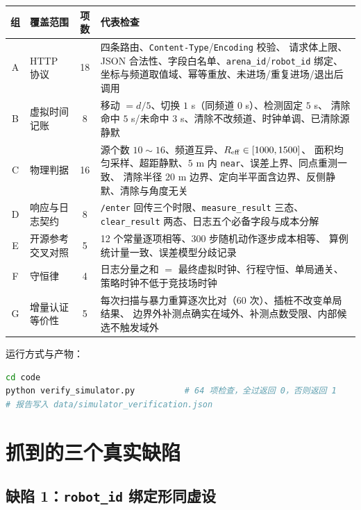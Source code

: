 \begin{center}
\begin{tabular}{clcp{6.6cm}}
\toprule
组 & 覆盖范围 & 项数 & 代表检查 \\ \midrule
A & HTTP 协议 & 18 & 四条路由、\texttt{Content-Type}/\texttt{Encoding} 校验、
请求体上限、JSON 合法性、字段白名单、\texttt{arena\_id}/\texttt{robot\_id} 绑定、
坐标与频道取值域、幂等重放、未进场/重复进场/退出后调用 \\
B & 虚拟时间记账 & 8 & 移动 $=d/5$、切换 $1$ s（同频道 $0$ s）、检测固定 $5$ s、
清除命中 $5$ s/未命中 $3$ s、清除不改频道、时钟单调、已清除源静默 \\
C & 物理判据 & 16 & 源个数 $10\sim16$、频道互异、$R_{\rm eff}\in[1000,1500]$、
面积均匀采样、超距静默、$5$ m 内 \texttt{near}、误差上界、同点重测一致、
清除半径 $20$ m 边界、定向半平面含边界、反侧静默、清除与角度无关 \\
D & 响应与日志契约 & 8 & \texttt{/enter} 回传三个时限、\texttt{measure\_result} 三态、
\texttt{clear\_result} 两态、日志五个必备字段与成本分解 \\
E & 开源参考交叉对照 & 5 & 12 个常量逐项相等、300 步随机动作逐步成本相等、
算例统计量一致、误差模型分歧记录 \\
F & 守恒律 & 4 & 日志分量之和 $=$ 最终虚拟时钟、行程守恒、单局通关、策略时钟不低于竞技场时钟 \\
G & 增量认证等价性 & 5 & 每次扫描与暴力重算逐次比对（60 次）、插桩不改变单局结果、
边界外补测点确实在域外、补测点数受限、内部候选不触发域外 \\
\bottomrule
\end{tabular}
\end{center}

运行方式与产物：
\begin{lstlisting}[language=bash]
cd code
python verify_simulator.py          # 64 项检查，全过返回 0，否则返回 1
# 报告写入 data/simulator_verification.json
\end{lstlisting}

\section{抓到的三个真实缺陷}

\subsection{缺陷 1：\texttt{robot\_id} 绑定形同虚设}

